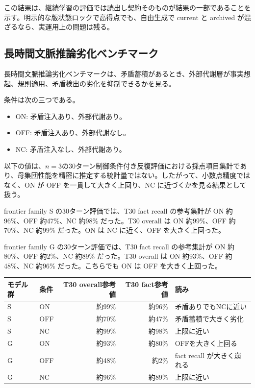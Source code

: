 \documentclass[12pt,a4paper]{article}
\begin{document}
この結果は、継続学習の評価では読出し契約そのものが結果の一部であることを示す。明示的な版状態ロックで高得点でも、自由生成で current と archived が混ざるなら、実運用上の問題は残る。

\subsection{長時間文脈推論劣化ベンチマーク}\label{ux9577ux6642ux9593ux6587ux8108ux63a8ux8ad6ux52a3ux5316ux30d9ux30f3ux30c1ux30deux30fcux30af}

長時間文脈推論劣化ベンチマークは、矛盾蓄積があるとき、外部代謝層が事実想起、規則適用、矛盾検出の劣化を抑制できるかを見る。

条件は次の三つである。

\begin{itemize}
\tightlist
\item
  ON: 矛盾注入あり、外部代謝あり。
\item
  OFF: 矛盾注入あり、外部代謝なし。
\item
  NC: 矛盾注入なし、外部代謝あり。
\end{itemize}

以下の値は、\(n=3\)の30ターン制御条件付き反復評価における採点項目集計であり、母集団性能を精密に推定する統計量ではない。したがって、小数点精度ではなく、ON が OFF を一貫して大きく上回り、NC に近づくかを見る結果として扱う。

frontier family S の30ターン評価では、T30 fact recall の参考集計が ON 約96\%、OFF 約47\%、NC 約98\% だった。T30 overall は ON 約99\%、OFF 約70\%、NC 約99\% だった。ON は NC に近く、OFF を大きく上回った。

frontier family G の30ターン評価では、T30 fact recall の参考集計が ON 約80\%、OFF 約2\%、NC 約89\% だった。T30 overall は ON 約93\%、OFF 約48\%、NC 約96\% だった。こちらでも ON は OFF を大きく上回った。

{\def\LTcaptype{table} %
\begin{longtable}[]{@{}llrrl@{}}
\toprule\noalign{}
モデル群 & 条件 & T30 overall参考値 & T30 fact参考値 & 読み \\
\midrule\noalign{}
\endhead
\bottomrule\noalign{}
\endlastfoot
S & ON & 約99\% & 約96\% & 矛盾ありでもNCに近い \\
S & OFF & 約70\% & 約47\% & 矛盾蓄積で大きく劣化 \\
S & NC & 約99\% & 約98\% & 上限に近い \\
G & ON & 約93\% & 約80\% & OFFを大きく上回る \\
G & OFF & 約48\% & 約2\% & fact recall が大きく崩れる \\
G & NC & 約96\% & 約89\% & 上限に近い \\
\end{longtable}
}
\end{document}
